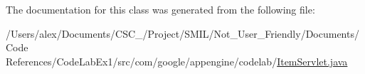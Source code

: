 The documentation for this class was generated from the following file\-:\begin{DoxyCompactItemize}
\item 
/\-Users/alex/\-Documents/\-C\-S\-C\-\_/\-Project/\-S\-M\-I\-L/\-Not\-\_\-\-User\-\_\-\-Friendly/\-Documents/\-Code References/\-Code\-Lab\-Ex1/src/com/google/appengine/codelab/\hyperlink{_item_servlet_8java}{Item\-Servlet.\-java}\end{DoxyCompactItemize}
